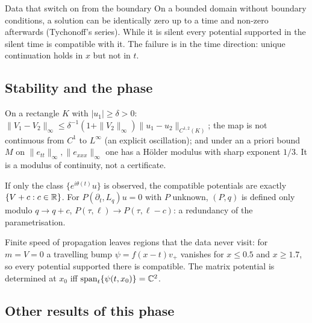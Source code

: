 \begin{falsebox}{Data that switch on from the boundary}{\falsest}
On a bounded domain without boundary conditions, a solution can be identically zero up to a time and non-zero afterwards (Tychonoff's series). While it is silent every potential supported in the silent time is compatible with it. The failure is in the time direction: unique continuation holds in $x$ but not in $t$.
\end{falsebox}

\subsection{Stability and the phase}

\begin{theorem}\label{thm:varp3}
On a rectangle $K$ with $|u_1|\ge\delta>0$: $\|V_1-V_2\|_\infty\le\delta^{-1}(1+\|V_2\|_\infty)\|u_1-u_2\|_{C^{1,2}(K)}$; the map is not continuous from $C^1$ to $L^\infty$ (an explicit oscillation); and under an a priori bound $M$ on $\|e_{tt}\|_\infty,\|e_{xxx}\|_\infty$ one has a H\"older modulus with sharp exponent $1/3$. It is a modulus of continuity, not a certificate.
\end{theorem}

\begin{theorem}\label{thm:varp4}
If only the class $\{e^{i\theta(t)}u\}$ is observed, the compatible potentials are exactly $\{V+c:c\in\mathbb{R}\}$. For $P(\partial_t,L_q)u=0$ with $P$ unknown, $(P,q)$ is defined only modulo $q\to q+c$, $P(\tau,\ell)\to P(\tau,\ell-c)$: a redundancy of the parametrisation.
\end{theorem}

\begin{proposition}\label{prop:varp5}
Finite speed of propagation leaves regions that the data never visit: for $m=V=0$ a travelling bump $\psi=f(x-t)v_+$ vanishes for $x\le0.5$ and $x\ge1.7$, so every potential supported there is compatible. The matrix potential is determined at $x_0$ iff $\mathrm{span}_t\{\psi(t,x_0)\}=\mathbb{C}^2$.
\end{proposition}

\subsection{Other results of this phase}

